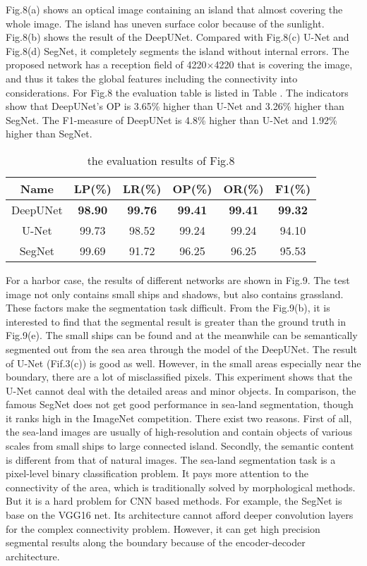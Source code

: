 \documentclass[conference]{IEEEtran}
\begin{document}
Fig.8(a) shows an optical image containing an island that almost covering the whole image. The island has uneven surface color because of the sunlight. Fig.8(b) shows the result of the DeepUNet. Compared with Fig.8(c) U-Net and Fig.8(d) SegNet, it completely segments the island without internal errors. The proposed network has a reception field of 4220$\times$4220 that is covering the image, and thus it takes the global features including the connectivity into considerations. For Fig.8 the evaluation table is listed in Table \uppercase\expandafter{}. The indicators show that DeepUNet's OP is 3.65\% higher than U-Net and 3.26\% higher than SegNet. The F1-measure of DeepUNet is 4.8\% higher than U-Net and 1.92\% higher than SegNet.

\begin{table}[h]
\centering
\caption{the evaluation results of Fig.8}
\begin{tabular}{|c|c|c|c|c|c|}
\hline
Name & LP(\%) & LR(\%) & OP(\%) & OR(\%) & F1(\%) \\
\hline
DeepUNet & \textbf{98.90} & \textbf{99.76} & \textbf{99.41} & \textbf{99.41} & \textbf{99.32} \\
\hline
U-Net & 99.73 & 98.52 & 99.24 & 99.24 & 94.10 \\
\hline
SegNet & 99.69 & 91.72 & 96.25 & 96.25 & 95.53 \\
\hline
\end{tabular}
\label{table3}
\end{table}

For a harbor case, the results of different networks are shown in Fig.9. The test image not only contains small ships and shadows, but also contains grassland. These factors make the segmentation task difficult. From the Fig.9(b), it is interested to find that the segmental result is greater than the ground truth in Fig.9(e). The small ships can be found  and at the meanwhile can be semantically segmented out from the sea area through the model of the DeepUNet. The result of U-Net (Fif.3(c)) is good as well. However, in the small areas especially near the boundary, there are a lot of misclassified pixels. This experiment shows that the U-Net cannot deal with the detailed areas and minor objects. In comparison, the famous SegNet does not get good performance in sea-land segmentation, though it ranks high in the ImageNet competition. There exist two reasons. First of all,  the sea-land images are usually of high-resolution and contain objects of various scales from small ships to large connected island. Secondly, the semantic content is different from that of natural images. The sea-land segmentation task is a pixel-level binary classification problem. It pays more attention to the connectivity of the area, which is traditionally solved by morphological methods. But it is a hard problem for CNN based methods. For example, the SegNet is base on the VGG16 net. Its architecture cannot afford deeper convolution layers for the complex connectivity problem. However, it can get high precision  segmental results along the boundary because of the encoder-decoder architecture. 
\end{document}
